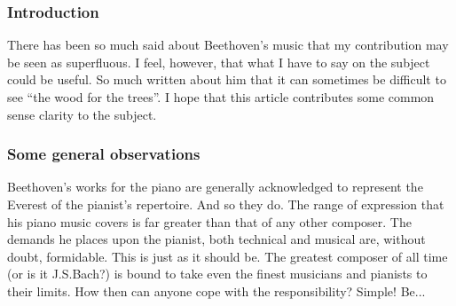 \documentclass{article}
\begin{document}
\subsubsection{Introduction}

There has been so much said about Beethoven's music that my contribution may be seen as superfluous.
I feel, however, that what I have to say on the subject could be useful.
So much written about him that it can sometimes be difficult to see ``the wood for the trees''.
I hope that this article contributes some common sense clarity to the subject.

\subsubsection{Some general observations}

Beethoven's works for the piano are generally acknowledged to represent the Everest of the pianist's repertoire.
And so they do.
The range of expression that his piano music covers is far greater than that of any other composer.
The demands he places upon the pianist, both technical and musical are, without doubt, formidable.
This is just as it should be.
The greatest composer of all time (or is it J.S.Bach?) is bound to take even the finest musicians and pianists to their limits.
How then can anyone cope with the responsibility?
Simple!
Be...
\end{document}

